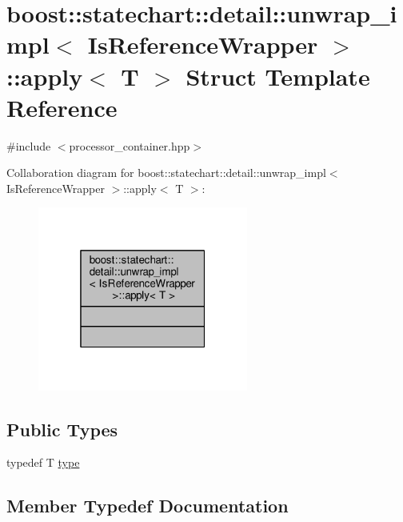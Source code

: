 \hypertarget{structboost_1_1statechart_1_1detail_1_1unwrap__impl_1_1apply}{}\section{boost\+:\+:statechart\+:\+:detail\+:\+:unwrap\+\_\+impl$<$ Is\+Reference\+Wrapper $>$\+:\+:apply$<$ T $>$ Struct Template Reference}
\label{structboost_1_1statechart_1_1detail_1_1unwrap__impl_1_1apply}


{\ttfamily \#include $<$processor\+\_\+container.\+hpp$>$}



Collaboration diagram for boost\+:\+:statechart\+:\+:detail\+:\+:unwrap\+\_\+impl$<$ Is\+Reference\+Wrapper $>$\+:\+:apply$<$ T $>$\+:
\nopagebreak
\begin{figure}[H]
\begin{center}
\leavevmode
\includegraphics[width=196pt]{structboost_1_1statechart_1_1detail_1_1unwrap__impl_1_1apply__coll__graph}
\end{center}
\end{figure}
\subsection*{Public Types}
\begin{DoxyCompactItemize}
\item 
typedef T \mbox{\hyperlink{structboost_1_1statechart_1_1detail_1_1unwrap__impl_1_1apply_a876d02ff6c624d7c2cb5ed523eca7eef}{type}}
\end{DoxyCompactItemize}


\subsection{Member Typedef Documentation}
\mbox{\label{structboost_1_1statechart_1_1detail_1_1unwrap__impl_1_1apply_a876d02ff6c624d7c2cb5ed523eca7eef}} 
